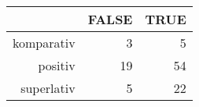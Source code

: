 \begin{tabular}{rrr}
  \hline
 & FALSE & TRUE \\ 
  \hline
komparativ & 3 & 5 \\ 
  positiv & 19 & 54 \\ 
  superlativ & 5 & 22 \\ 
   \hline
\end{tabular}
